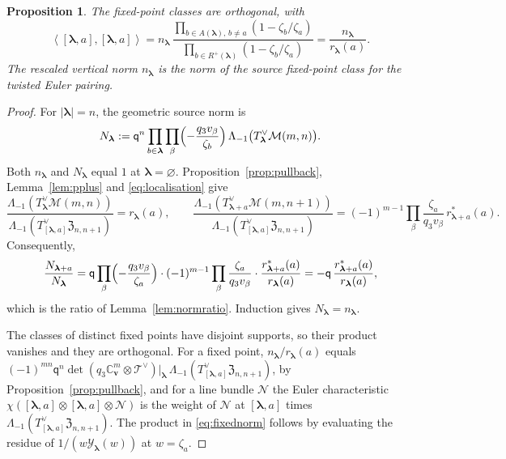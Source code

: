 \documentclass[11pt]{amsart}
\newtheorem{proposition}[theorem]{Proposition}
\theoremstyle{definition}
\theoremstyle{remark}
\newcommand{\Mq}{\mathsf q}                      %
\newcommand{\bv}{{\mathbf v}}                    %
\newcommand{\bl}{{\boldsymbol{\lambda}}}         %
\newcommand{\Add}[1]{A(#1)}                      %
\newcommand{\bwt}[1]{\zeta_{#1}}                 %
\newcommand{\CY}{\mathcal Y}
\newcommand{\Yfn}[1]{\CY_{#1}}                   %
\newcommand{\res}[2]{r_{#1}(#2)}                 %
\newcommand{\cores}[2]{r^*_{#1}(#2)}             %
\newcommand{\srcnorm}[1]{n_{#1}}                 %
\newcommand{\ip}[2]{\left\langle #1,#2\right\rangle}
\newcommand{\Remp}[1]{R^{+}(#1)}                 %
\newcommand{\framing}{\mathbb C^m_{\bv}}         %
\newcommand{\Gies}[2]{\mathcal M(#1,#2)}         %
\newcommand{\Zc}{\mathfrak Z}
\newcommand{\Hecke}[1]{\Zc_{#1,#1+1}}            %
\newcommand{\Tc}{\mathcal T}                     %
\newcommand{\pt}[2]{[#1,#2]}                     %
\begin{document}
\begin{proposition}\label{prop:euler}
The fixed-point classes are orthogonal, with
\begin{equation}\label{eq:fixednorm}
 \ip{\pt{\bl}{a}}{\pt{\bl}{a}}
 =\srcnorm{\bl}\,
 \frac{\prod_{b\in\Add{\bl},\,b\neq a}(1-\bwt{b}/\bwt{a})}
      {\prod_{b\in\Remp{\bl}}(1-\bwt{b}/\bwt{a})}
 =\frac{\srcnorm{\bl}}{\res{\bl}{a}}.
\end{equation}
The rescaled vertical norm \(\srcnorm{\bl}\) is the norm of the source
fixed-point class for the twisted Euler pairing.
\end{proposition}

\begin{proof}
For \(|\bl|=n\), the geometric source norm is
\begin{equation}\label{eq:sourcenormEuler}
 N_\bl:=\Mq^{n}\prod_{b\in\bl}\prod_\beta\Bigl(-\frac{q_3v_\beta}{\bwt{b}}\Bigr)\,
 \Lambda_{-1}\bigl(T^\vee_\bl\Gies{m}{n}\bigr).
\end{equation}
Both \(\srcnorm{\bl}\) and \(N_\bl\) equal \(1\) at \(\bl=\varnothing\).
Proposition~\ref{prop:pullback}, Lemma~\ref{lem:pplus} and \eqref{eq:localisation} give
\[
 \frac{\Lambda_{-1}(T^\vee_{\bl}\Gies{m}{n})}
      {\Lambda_{-1}(T^\vee_{\pt{\bl}{a}}\Hecke{n})}=\res{\bl}{a},
 \qquad
 \frac{\Lambda_{-1}(T^\vee_{\bl+a}\Gies{m}{n+1})}
      {\Lambda_{-1}(T^\vee_{\pt{\bl}{a}}\Hecke{n})}
 =(-1)^{m-1}\prod_\beta\frac{\bwt{a}}{q_3v_\beta}\,\cores{\bl+a}{a}.
\]
Consequently,
\[
 \frac{N_{\bl+a}}{N_\bl}
 =\Mq\prod_\beta\Bigl(-\frac{q_3v_\beta}{\bwt{a}}\Bigr)\cdot
  (-1)^{m-1}\prod_\beta\frac{\bwt{a}}{q_3v_\beta}\cdot
  \frac{\cores{\bl+a}{a}}{\res{\bl}{a}}
 =-\Mq\,\frac{\cores{\bl+a}{a}}{\res{\bl}{a}},
\]
which is the ratio of Lemma~\ref{lem:normratio}. Induction gives \(N_\bl=\srcnorm{\bl}\).

The classes of distinct fixed points have disjoint supports, so their product vanishes and they are
orthogonal. For a fixed point, \(\srcnorm{\bl}/\res{\bl}{a}\) equals
\((-1)^{mn}\Mq^n\det(q_3\framing\otimes\Tc^\vee)|_\bl\,
\Lambda_{-1}(T^\vee_{\pt{\bl}{a}}\Hecke{n})\), by Proposition~\ref{prop:pullback}, and for a line
bundle \(\mathcal N\) the Euler characteristic \(\chi(\pt{\bl}{a}\otimes\pt{\bl}{a}\otimes\mathcal N)\) is the
weight of \(\mathcal N\) at \(\pt{\bl}{a}\) times \(\Lambda_{-1}(T^\vee_{\pt{\bl}{a}}\Hecke{n})\).
The product in \eqref{eq:fixednorm} follows by evaluating the residue of
\(1/(w\Yfn{\bl}(w))\) at \(w=\bwt{a}\).
\end{proof}
\end{document}
